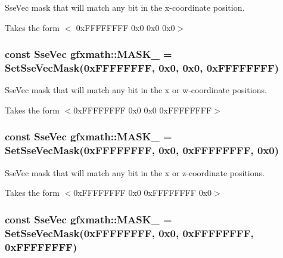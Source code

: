 Sse\+Vec mask that will match any bit in the x-\/coordinate position. 

Takes the form $<$ 0x\+F\+F\+F\+F\+F\+F\+F\+F 0x0 0x0 0x0$>$ \hypertarget{namespacegfxmath_a614228347cb24ffbda356c24735c1b3b}{}
\subsubsection[{M\+A\+S\+K\+\_\+1001}]{\setlength{\rightskip}{0pt plus 5cm}const {\bf Sse\+Vec} gfxmath\+::\+M\+A\+S\+K\+\_ = {\bf Set\+Sse\+Vec\+Mask}(0x\+F\+F\+F\+F\+F\+F\+F\+F, 0x0, 0x0, 0x\+F\+F\+F\+F\+F\+F\+F\+F)}\label{namespacegfxmath_a614228347cb24ffbda356c24735c1b3b}


Sse\+Vec mask that will match any bit in the x or w-\/coordinate positions. 

Takes the form $<$0x\+F\+F\+F\+F\+F\+F\+F\+F 0x0 0x0 0x\+F\+F\+F\+F\+F\+F\+F\+F$>$ \hypertarget{namespacegfxmath_aa01027212a31efde9054027b6a9c54de}{}
\subsubsection[{M\+A\+S\+K\+\_\+1010}]{\setlength{\rightskip}{0pt plus 5cm}const {\bf Sse\+Vec} gfxmath\+::\+M\+A\+S\+K\+\_ = {\bf Set\+Sse\+Vec\+Mask}(0x\+F\+F\+F\+F\+F\+F\+F\+F, 0x0, 0x\+F\+F\+F\+F\+F\+F\+F\+F, 0x0)}\label{namespacegfxmath_aa01027212a31efde9054027b6a9c54de}


Sse\+Vec mask that will match any bit in the x or z-\/coordinate positions. 

Takes the form $<$0x\+F\+F\+F\+F\+F\+F\+F\+F 0x0 0x\+F\+F\+F\+F\+F\+F\+F\+F 0x0$>$ \hypertarget{namespacegfxmath_aacb5eed4ebafce721c4db8d6358854f6}{}
\subsubsection[{M\+A\+S\+K\+\_\+1011}]{\setlength{\rightskip}{0pt plus 5cm}const {\bf Sse\+Vec} gfxmath\+::\+M\+A\+S\+K\+\_ = {\bf Set\+Sse\+Vec\+Mask}(0x\+F\+F\+F\+F\+F\+F\+F\+F, 0x0, 0x\+F\+F\+F\+F\+F\+F\+F\+F, 0x\+F\+F\+F\+F\+F\+F\+F\+F)}\label{namespacegfxmath_aacb5eed4ebafce721c4db8d6358854f6}


